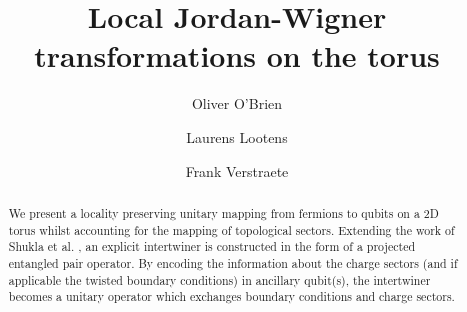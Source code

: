 \documentclass[aps,prx,twocolumn,floatfix,10pt,amssymb,amsfont,amsmath,superscriptaddress,float,nofootinbib,longbibliography,nobalancelastpage]{revtex4-2}
\begin{document}
\title{Local Jordan-Wigner transformations on the torus}

\author{Oliver O'Brien}
\author{Laurens Lootens}
\author{Frank Verstraete}




\begin{abstract}
We present a locality preserving unitary mapping from fermions to qubits on a 2D torus whilst accounting for the mapping of topological sectors. Extending the work of Shukla et al. \cite{Shukla_2020}, an explicit intertwiner is constructed in the form of a projected entangled pair operator. By encoding the information about the charge sectors (and if applicable the twisted boundary conditions) in ancillary qubit(s), the intertwiner becomes a  unitary operator which exchanges boundary conditions and charge sectors.
\end{abstract}


\maketitle
\end{document}
